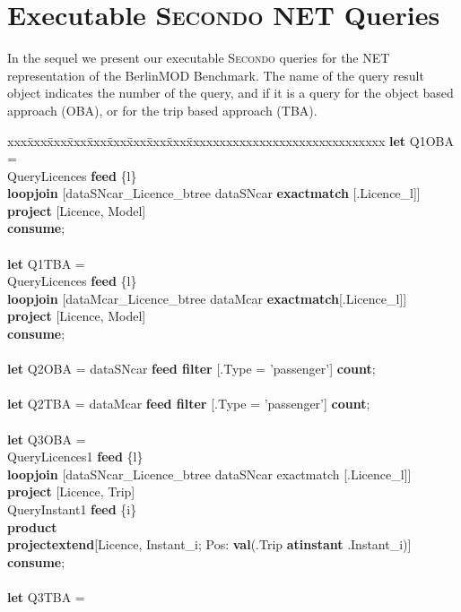 \documentclass[a4paper]{article}
\newcommand{\secondo}{\textsc{Secondo}}
\newcommand{\bmodb} {BerlinMOD Benchmark}
\newcommand{\op}[1]{\textbf{#1}}
\begin{document}
\section{Executable \secondo{} NET Queries}
\label{app:executableQueries}
In the sequel we present our executable \secondo{} queries for the NET representation
of the \bmodb{}. The name of the query result object indicates the number of
the query, and if it is a query for the object based approach (OBA), or for the
trip based approach (TBA).
\begin{scriptsize}
\begin{tabbing}
xxx\=xxx\=xxx\=xxx\=xxx\=xxx\=xxx\=xxx\=xxx\=xxxxxxxxxxxxxxxxxxxxxxxxxxxxxx\kill
\op{let} Q1OBA =\\
\>QueryLicences \op{feed} \{l\}\\
\>\op{loopjoin} [dataSNcar\_Licence\_btree dataSNcar \op{exactmatch} [.Licence\_l]]\\
\>\op{project} [Licence, Model]\\
\op{consume};\\
\\
\op{let} Q1TBA =\\
\>QueryLicences \op{feed} \{l\}\\
\>\op{loopjoin} [dataMcar\_Licence\_btree dataMcar \op{exactmatch}[.Licence\_l]]\\
\>\op{project} [Licence, Model]\\
\op{consume};\\
\\
\op{let} Q2OBA = dataSNcar \op{feed filter} [.Type = 'passenger'] \op{count};\\
\\
\op{let} Q2TBA = dataMcar \op{feed filter} [.Type = 'passenger'] \op{count};\\
\\
\op{let} Q3OBA =\\
\>QueryLicences1 \op{feed} \{l\}\\
\>\>\op{loopjoin} [dataSNcar\_Licence\_btree dataSNcar exactmatch [.Licence\_l]]\\
\>\>\op{project} [Licence, Trip]\\
\>QueryInstant1 \op{feed} \{i\}\\
\>\op{product}\\
\>\op{projectextend}[Licence, Instant\_i; Pos: \op{val}(.Trip \op{atinstant} .Instant\_i)]\\
\op{consume};\\
\\
\op{let} Q3TBA =\\

\end{tabbing}
\end{scriptsize}
\end{document}
